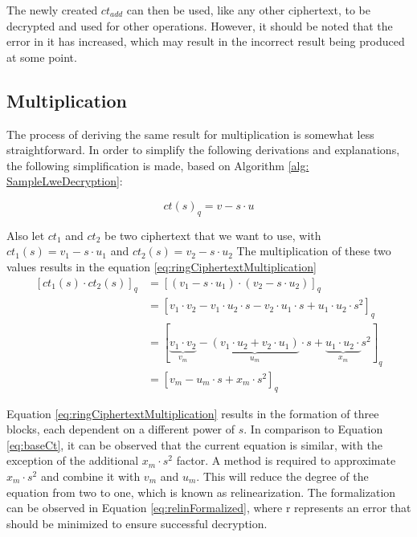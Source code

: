 The newly created $ct_{add}$ can then be used, like any other ciphertext, to be decrypted and used for other operations. However, it should be noted that the error in it has increased, which may result in the incorrect result being produced at some point.

\subsection*{Multiplication}

The process of deriving the same result for multiplication is somewhat less straightforward. In order to simplify the following derivations and explanations, the following simplification is made, based on Algorithm \ref{alg: SampleLweDecryption}:

\begin{equation}
  ct(s)_q = v-s\cdot u
  \label{eq:baseCt}
\end{equation}

Also let $ct_1$ and $ct_2$ be two ciphertext that we want to use, with $ct_1(s) = v_1-s\cdot u_1$ and $ct_2(s) = v_2-s\cdot u_2$
The multiplication of these two values results in the equation \ref{eq:ringCiphertextMultiplication}
\begin{equation}
  \begin{split}
    [ct_1(s)\cdot ct_2(s)]_q & = [(v_1-s\cdot u_1) \cdot (v_2-s\cdot u_2)]_q                                                                                              \\
                             & = [v_1\cdot v_2 - v_1\cdot u_2 \cdot s- v_2\cdot u_1\cdot s + u_1\cdot u_2\cdot s^2]_q                                                     \\
                             & = [\underbrace{v_1\cdot v_2}_{v_m} - \underbrace{(v_1\cdot u_2 + v_2\cdot u_1)}_{u_m}\cdot s + \underbrace{u_1\cdot u_2\cdot}_{x_m} s^2]_q \\
                             & = [v_m - u_m\cdot s + x_m \cdot s^2]_q
  \end{split}
  \label{eq:ringCiphertextMultiplication}
\end{equation}

Equation \ref{eq:ringCiphertextMultiplication} results in the formation of three blocks, each dependent on a different power of $s$. In comparison to Equation \ref{eq:baseCt}, it can be observed that the current equation is similar, with the exception of the additional $x_m\cdot s^2$ factor. 
A method is required to approximate $x_m\cdot s^2$ and combine it with $v_m$ and $u_m$. This will reduce the degree of the equation from two to one, which is known as relinearization. The formalization can be observed in Equation \ref{eq:relinFormalized}, where r represents an error that should be minimized to ensure successful decryption.

